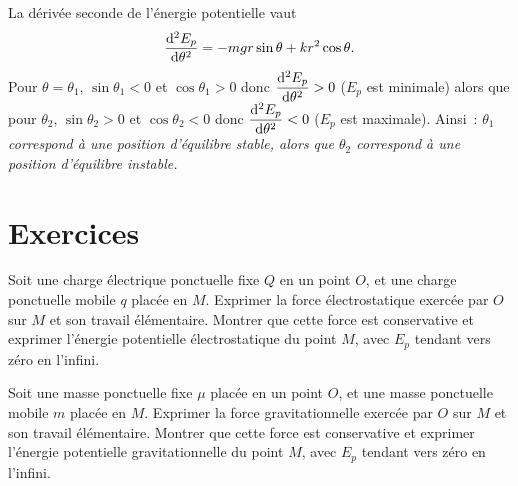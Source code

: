 La dérivée seconde de l'énergie potentielle vaut
\begin{equation}
  \dfrac{\mathrm{d}^2 E_p}{\mathrm{d} {\theta}^2} = -mgr\sin\theta +kr^2\cos\theta.
\end{equation}
Pour \(\theta=\theta_1\), \(\sin\theta_1<0\) et \(\cos\theta_1>0\) donc \(\dfrac{\mathrm{d}^2 E_p}{\mathrm{d} {\theta}^2}>0\) (\(E_p\) est minimale) alors que pour \(\theta_2\), \(\sin\theta_2>0\) et \(\cos\theta_2<0\) donc \(\dfrac{\mathrm{d}^2 E_p}{\mathrm{d} {\theta}^2}<0\) (\(E_p\) est maximale). Ainsi~: \emph{\(\theta_1\) correspond à une position d'équilibre stable, alors que \(\theta_2\) correspond à une position d'équilibre instable.}
\section{Exercices}
\label{chap4-sec:exercices}
\begin{exercice}
  Soit une charge électrique ponctuelle fixe \(Q\) en un point \(O\), et une charge ponctuelle mobile \(q\) placée en \(M\). Exprimer la force électrostatique exercée par \(O\) sur \(M\) et son travail élémentaire. Montrer que cette force est conservative et exprimer l'énergie potentielle électrostatique du point \(M\), avec \(E_p\) tendant vers zéro en l'infini.
\end{exercice}
%
\begin{exercice}
  Soit une masse ponctuelle fixe \(\mu\) placée en un point \(O\), et une masse ponctuelle mobile \(m\) placée en \(M\). Exprimer la force gravitationnelle exercée par \(O\) sur \(M\) et son travail élémentaire. Montrer que cette force est conservative et exprimer l'énergie potentielle gravitationnelle du point \(M\), avec \(E_p\) tendant vers zéro en l'infini.
\end{exercice}
%
